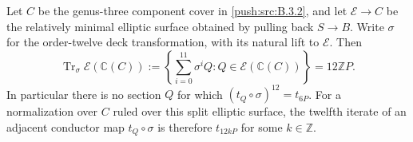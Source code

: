 \begin{theorem}\hypertarget{tag-0308}{}\label{push:src:B.3.4}\label{push:B34}

Let $C$ be the genus-three component cover
in \ref{push:src:B.3.2}, and let $\mathscr E\to C$ be
the relatively minimal elliptic surface
obtained by pulling back $S\to B$.
Write $\sigma$ for the order-twelve deck
transformation, with its natural lift to
$\mathscr E$. Then
\[
 \operatorname{Tr}_{\sigma}
   \mathscr E(\mathbb C(C))
 :=\left\{\sum_{i=0}^{11}\sigma^i Q:
                 Q\in\mathscr E(\mathbb C(C))\right\}
 =12\mathbb Z P.
\]
In particular there is no section $Q$
for which $(t_Q\circ\sigma)^{12}=t_{6P}$.
For a normalization over $C$ ruled over this split elliptic
surface, the twelfth iterate of an adjacent conductor map
$t_Q\circ\sigma$ is therefore $t_{12kP}$ for some $k\in\mathbb Z$.

\end{theorem}



